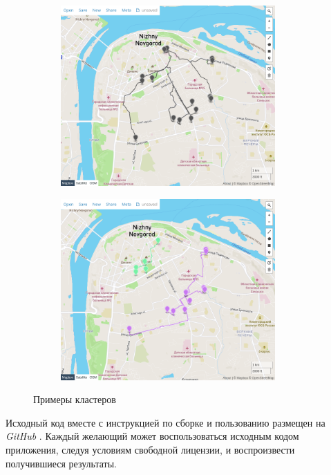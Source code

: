 \documentclass[11pt]{article}
\begin{document}
	\begin{figure}[ht]
	\begin{subfigure}{0.5\textwidth}
		\centering
		\includegraphics[width=0.9\textwidth]{images/k1.png}
	\end{subfigure}	
	\begin{subfigure}{0.5\textwidth}
		\centering
		\includegraphics[width=0.9\textwidth]{images/k2.png}
	\end{subfigure}	
	\caption{Примеры кластеров}
	\label{fig:cluster}
	\end{figure}	
	
	Исходный код вместе с инструкцией по сборке и пользованию размещен на \textit{GitHub} \cite{github}.    
	Каждый желающий может воспользоваться исходным кодом приложения, следуя условиям свободной лицензии, и воспроизвести получившиеся результаты.
    
	
	
	
\end{document}
